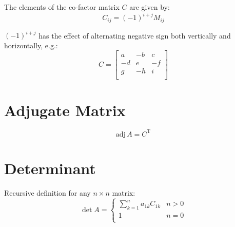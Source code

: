 \documentclass{article}
\begin{document}
    The elements of the co-factor matrix $C$ are given by: \begin{equation}
        C_{ij} = (-1)^{i + j} M_{ij}
    \end{equation}

    $(-1)^{i + j}$ has the effect of alternating negative sign both vertically and horizontally, e.g.: $$C = \begin{bmatrix}
        a & -b & c \\
        -d & e & -f \\
        g & -h & i \\
    \end{bmatrix}$$

    \section{Adjugate Matrix}

    \begin{equation}
        \text{adj}{\,A} = C^\text{T}
    \end{equation}

    \section{Determinant}

    Recursive definition for any $n \times n$ matrix: \begin{equation}
        \det{A} = \begin{cases}
            \sum_{k = 1}^n{a_{1k}C_{1k}} & n > 0 \\
            1 & n = 0 \\
        \end{cases}
    \end{equation}
\end{document}
